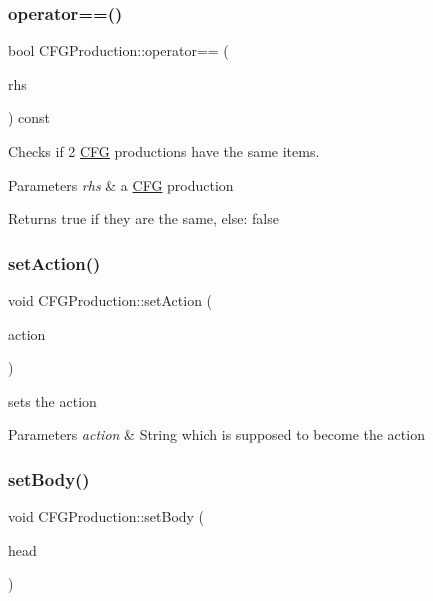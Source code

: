 \subsubsection{\texorpdfstring{operator==()}{operator==()}}
{\footnotesize\ttfamily bool C\+F\+G\+Production\+::operator== (\begin{DoxyParamCaption}\item[{const \hyperlink{classCFGProduction}{C\+F\+G\+Production} \&}]{rhs }\end{DoxyParamCaption}) const}



Checks if 2 \hyperlink{classCFG}{C\+FG} productions have the same items. 


\begin{DoxyParams}{Parameters}
{\em rhs} & a \hyperlink{classCFG}{C\+FG} production \\
\hline
\end{DoxyParams}
\begin{DoxyReturn}{Returns}
true if they are the same, else\+: false 
\end{DoxyReturn}
\mbox{\label{classCFGProduction_a2fd2500ef771a372b1ebdd4919dde770}} 
\subsubsection{\texorpdfstring{set\+Action()}{setAction()}}
{\footnotesize\ttfamily void C\+F\+G\+Production\+::set\+Action (\begin{DoxyParamCaption}\item[{const std\+::string \&}]{action }\end{DoxyParamCaption})}



sets the action 


\begin{DoxyParams}{Parameters}
{\em action} & String which is supposed to become the action \\
\hline
\end{DoxyParams}
\mbox{\label{classCFGProduction_a40047c89f0959a9282e84413f01ce876}} 
\subsubsection{\texorpdfstring{set\+Body()}{setBody()}}
{\footnotesize\ttfamily void C\+F\+G\+Production\+::set\+Body (\begin{DoxyParamCaption}\item[{const std\+::vector$<$ std\+::string $>$ \&}]{head }\end{DoxyParamCaption})}



